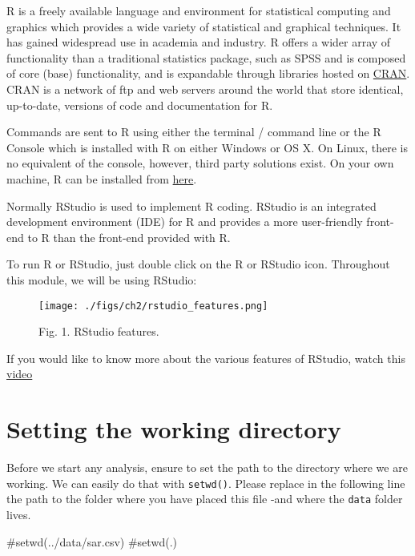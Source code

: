 \documentclass[
  letterpaper,
  krantz2]{style/krantz}
\newenvironment{Shaded}{\begin{snugshade}}{\end{snugshade}}
\newcommand{\CommentTok}[1]{\textcolor[rgb]{0.37,0.37,0.37}{#1}}
\begin{document}
R is a freely available language and environment for statistical
computing and graphics which provides a wide variety of statistical and
graphical techniques. It has gained widespread use in academia and
industry. R offers a wider array of functionality than a traditional
statistics package, such as SPSS and is composed of core (base)
functionality, and is expandable through libraries hosted on
\href{https://cran.r-project.org}{CRAN}. CRAN is a network of ftp and
web servers around the world that store identical, up-to-date, versions
of code and documentation for R.

Commands are sent to R using either the terminal / command line or the R
Console which is installed with R on either Windows or OS X. On Linux,
there is no equivalent of the console, however, third party solutions
exist. On your own machine, R can be installed from
\href{https://www.r-project.org/}{here}.

Normally RStudio is used to implement R coding. RStudio is an integrated
development environment (IDE) for R and provides a more user-friendly
front-end to R than the front-end provided with R.

To run R or RStudio, just double click on the R or RStudio icon.
Throughout this module, we will be using RStudio:

\begin{figure}

{\centering \texttt{[image: ./figs/ch2/rstudio\_features.png]}

}

\caption{Fig. 1. RStudio features.}

\end{figure}

If you would like to know more about the various features of RStudio,
watch this \href{https://rstudio.com/products/rstudio/}{video}

\hypertarget{setting-the-working-directory}{%
\section{Setting the working
directory}\label{setting-the-working-directory}}

Before we start any analysis, ensure to set the path to the directory
where we are working. We can easily do that with \texttt{setwd()}.
Please replace in the following line the path to the folder where you
have placed this file -and where the \texttt{data} folder lives.

\begin{Shaded}
\begin{Highlighting}[]
\CommentTok{\#setwd(\textquotesingle{}../data/sar.csv\textquotesingle{})}
\CommentTok{\#setwd(\textquotesingle{}.\textquotesingle{})}
\end{Highlighting}
\end{Shaded}
\end{document}
